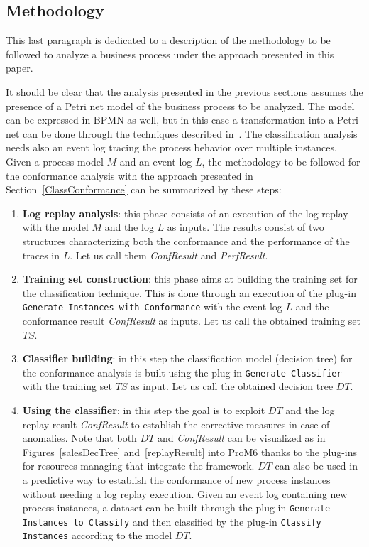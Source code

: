 \documentclass{llncs}
\begin{document}
\subsection{Methodology}
This last paragraph is dedicated to a description of the methodology to be followed to analyze a business process under the approach presented in this paper.

It should be clear that the analysis presented in the previous sections assumes the presence of a Petri net model of the business process to be analyzed. The model can be expressed in BPMN  as well, but in this case a transformation into a Petri net can be done through the techniques described in~\cite{DBLP:conf/wsfm/BruniCFFGS11}. The classification analysis  needs also an event log tracing the process behavior over multiple instances. Given a process model $M$ and an event log $L$, the methodology to be followed for the conformance analysis with the approach presented in Section~\ref{ClassConformance} can be summarized by these steps:
\begin{enumerate}

\item \label{step1} \textbf{Log replay analysis}: this phase consists of an execution of the log replay with  the model $M$ and the log $L$ as inputs. The results consist of two structures characterizing both the conformance and the performance of the traces in $L$. Let us call them \emph{ConfResult} and \emph{PerfResult}.

\item \label{step2} \textbf{Training set construction}: this phase aims at building the training set for the classification technique. This is done through an execution of the plug-in \texttt{Generate Instances with Conformance} with the event log $L$ and the conformance result \emph{ConfResult} as inputs. Let us call the obtained training set $TS$.

\item \textbf{Classifier building}: in this step the classification model (decision tree) for the conformance analysis is built using the plug-in \texttt{Generate Classifier} with the training set $TS$ as input. Let us call the obtained decision tree  $DT$.

\item \textbf{Using the classifier}: in this step the goal is to exploit $DT$ and the log replay result \emph{ConfResult} to establish the corrective measures in case of anomalies. Note that both $DT$ and \emph{ConfResult} can be visualized as in Figures~\ref{salesDecTree} and~\ref{replayResult} into ProM6 thanks to the plug-ins for resources managing that integrate the framework. $DT$ can also be used in a predictive way to establish the conformance of new process instances without needing a log replay execution. Given an event log containing new process instances, a dataset can be built through the plug-in \texttt{Generate Instances to Classify} and then classified by the plug-in \texttt{Classify Instances} according to the model $DT$.
\end{enumerate}
\end{document}
